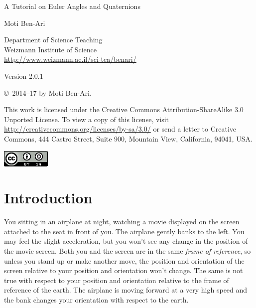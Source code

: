 \documentclass[11pt,a4paper]{report}
\begin{document}
\thispagestyle{empty}

\begin{center}
\begin{huge}
\begin{bfseries}
A Tutorial on Euler Angles and Quaternions
\end{bfseries}
\end{huge}

\bigskip
\bigskip
\bigskip

{\LARGE Moti Ben-Ari}

\bigskip

{\Large Department of Science Teaching\\
Weizmann Institute of Science\\
\bigskip
\url{http://www.weizmann.ac.il/sci-tea/benari/}
}

\bigskip
\bigskip


\begin{Large}
Version 2.0.1
\end{Large}
\end{center}

\vfill

\begin{center}
\copyright{}\  2014--17 by Moti Ben-Ari.
\end{center}

This work is licensed under the Creative Commons Attribution-ShareAlike 3.0 Unported License. To view a copy of this license, visit \url{http://creativecommons.org/licenses/by-sa/3.0/} or send a letter to Creative Commons, 444 Castro Street, Suite 900, Mountain View, California, 94041, USA.

\begin{center}
\includegraphics[width=.2\textwidth]{../by-sa.png}
\end{center}

\clearpage
\setcounter{page}{1}

\chapter{Introduction}\label{s.intro}

You sitting in an airplane at night, watching a movie displayed on the screen attached to the seat in front of you. The airplane gently banks to the left. You may feel the slight acceleration, but you won't see any change in the position of the movie screen. Both you and the screen are in the same \emph{frame of reference}, so unless you stand up or make another move, the position and orientation of the screen relative to your position and orientation won't change. The same is not true with respect to your position and orientation relative to the frame of reference of the earth. The airplane is moving forward at a very high speed and the bank changes your orientation with respect to the earth.
\end{document}
